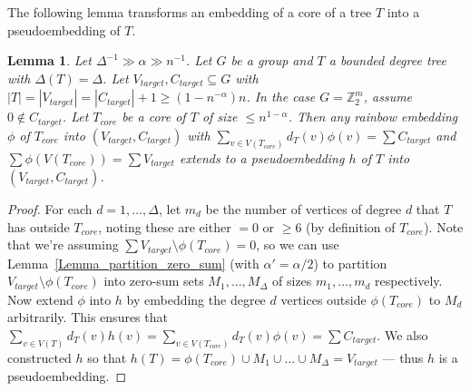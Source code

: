 \documentclass[a4paper,11pt,hidelinks]{amsart}
\newtheorem{lemma}[theorem]{Lemma}
\theoremstyle{definition}
\newcommand{\id}{{0}}%
\begin{document}
The following lemma transforms an embedding of a core of a tree $T$ into a pseudoembedding of $T$.
\begin{lemma}\label{Lemma_pseudoembed_tree_with_prescribed_core}
Let $\Delta^{-1}\gg \alpha\gg n^{-1}$.
Let $G$ be a group and $T$ a bounded degree tree with $\Delta(T)=\Delta$. Let $V_{target},C_{target}\subseteq G$ with $|T|=|V_{target}|=|C_{target}|+1\geq (1-n^{-\alpha})n$. In the case $G=\mathbb{Z}_2^m$, assume $\id \not\in C_{target}$. Let $T_{core}$ be a core of $T$ of size $\leq n^{1-\alpha}$. Then any rainbow embedding $\phi$  of $T_{core}$ into $(V_{target}, C_{target})$ with $\sum_{v\in V(T_{core})}d_T(v)\phi(v)=\sum C_{target}$ and $\sum \phi(V(T_{core}))=\sum V_{target}$ extends to a pseudoembedding $h$ of $T$ into $(V_{target}, C_{target})$.
\end{lemma}
\begin{proof}
For each $d=1, \dots, \Delta$, let $m_d$ be the number of vertices of degree $d$ that $T$ has outside $T_{core}$, noting these  are either $=0$ or  $\geq 6$ (by definition of $T_{core}$).
Note that we're assuming $\sum V_{target}\setminus \phi(T_{core})=0$, so we can use Lemma~\ref{Lemma_partition_zero_sum} (with $\alpha'=\alpha/2$) to partition $V_{target}\setminus \phi(T_{core})$ into zero-sum sets $M_1, \dots, M_{\Delta}$ of sizes $m_1, \dots, m_d$ respectively. Now extend $\phi$ into $h$ by embedding the degree $d$ vertices outside $\phi(T_{core})$ to $M_d$ arbitrarily. This ensures that $\sum_{v\in V(T)}d_T(v)h(v)=\sum_{v\in V(T_{core})}d_T(v)\phi(v)=\sum C_{target}$. We also  constructed $h$ so that $h(T)=\phi(T_{core})\cup M_1\cup \dots \cup M_{\Delta}=V_{target}$ --- thus $h$ is a pseudoembedding.
\end{proof}
\end{document}
